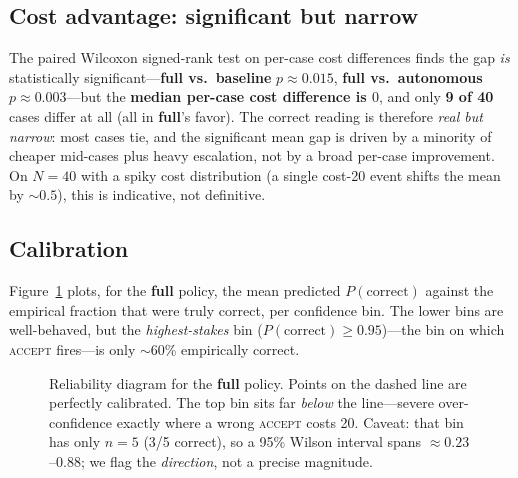 \documentclass[11pt]{article}
\newcommand{\pcorrect}{P(\text{correct})}
\begin{document}
\subsection{Cost advantage: significant but narrow}
The paired Wilcoxon signed-rank test on per-case cost differences finds the gap
\emph{is} statistically significant---\textbf{full vs.\ baseline} $p\approx0.015$,
\textbf{full vs.\ autonomous} $p\approx0.003$---but the \textbf{median per-case cost
difference is $0$}, and only \textbf{9 of 40} cases differ at all (all in
\textbf{full}'s favor). The correct reading is therefore \emph{real but narrow}: most
cases tie, and the significant mean gap is driven by a minority of cheaper mid-cases
plus heavy escalation, not by a broad per-case improvement. On $N=40$ with a spiky
cost distribution (a single cost-20 event shifts the mean by $\sim0.5$), this is
indicative, not definitive.

\subsection{Calibration}
Figure~\ref{fig:calib} plots, for the \textbf{full} policy, the mean predicted
$\pcorrect$ against the empirical fraction that were truly \textsf{correct}, per
confidence bin. The lower bins are well-behaved, but the \emph{highest-stakes} bin
($\pcorrect\ge0.95$)---the bin on which \textsc{accept} fires---is only $\sim$60\%
empirically correct.

\begin{figure}[h]
\centering
{}
\caption{Reliability diagram for the \textbf{full} policy. Points on the dashed line
are perfectly calibrated. The top bin sits far \emph{below} the line---severe
over-confidence exactly where a wrong \textsc{accept} costs 20. Caveat: that bin has
only $n=5$ (3/5 correct), so a 95\% Wilson interval spans $\approx0.23$--$0.88$; we
flag the \emph{direction}, not a precise magnitude.}
\label{fig:calib}
\end{figure}
\end{document}

